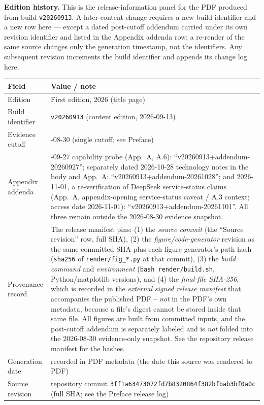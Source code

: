 \medskip
\noindent\textbf{Edition history.} This is the release-information panel for the PDF produced from build \texttt{v20260913}. A later content change requires a new build identifier and a new row here --- except a dated post-cutoff addendum carried under its own revision identifier and listed in the Appendix addenda row; a re-render of the same source changes only the generation timestamp, not the identifiers. Any subsequent revision increments the build identifier and appends its change log here.

\noindent\begin{tabularx}{\textwidth}{@{}>{\raggedright\arraybackslash}p{1.55in} >{\raggedright\arraybackslash}X@{}}
\toprule
\textbf{Field} & \textbf{Value / note}\\
\midrule
Edition & First edition, 2026 (title page)\\
Build identifier & \texttt{v20260913} (content edition, 2026-09-13)\\
Evidence cutoff & 2026-08-30 (single cutoff; see Preface)\\
Appendix addenda & 2026-09-27 capability probe (App.~A, A.6): ``v20260913+addendum-20260927''; separately dated 2026-10-28 technology notes in the body and App.~A: ``v20260913+addendum-20261028''; and 2026-11-01, a re-verification of DeepSeek service-status claims (App.~A, appendix-opening service-status caveat / A.3 context; access date 2026-11-01): ``v20260913+addendum-20261101''. All three remain outside the 2026-08-30 evidence snapshot.\\
Provenance record & The release manifest pins: (1) the \emph{source commit} (the ``Source revision'' row, full SHA), (2) the \emph{figure/code-generator} revision as the same committed SHA plus each figure generator's path hash (\texttt{sha256} of \texttt{render/fig\_*.py} at that commit), (3) the \emph{build command} and \emph{environment} (\texttt{bash render/build.sh}, Python/matplotlib versions), and (4) the \emph{final-file SHA-256}, which is recorded in the \emph{external signed release manifest} that accompanies the published PDF -- \emph{not} in the PDF's own metadata, because a file's digest cannot be stored inside that same file. All figures are built from committed inputs, and the post-cutoff addendum is separately labeled and is \emph{not} folded into the 2026-08-30 evidence-only snapshot. See the repository release manifest for the hashes.\\
Generation date & recorded in PDF metadata (the date this source was rendered to PDF)\\
Source revision & repository commit \texttt{3ff1a63473072fd7b8320864f382bfbab3bf0a0c} (full SHA; see the Preface release log)\\
\bottomrule
\end{tabularx}

